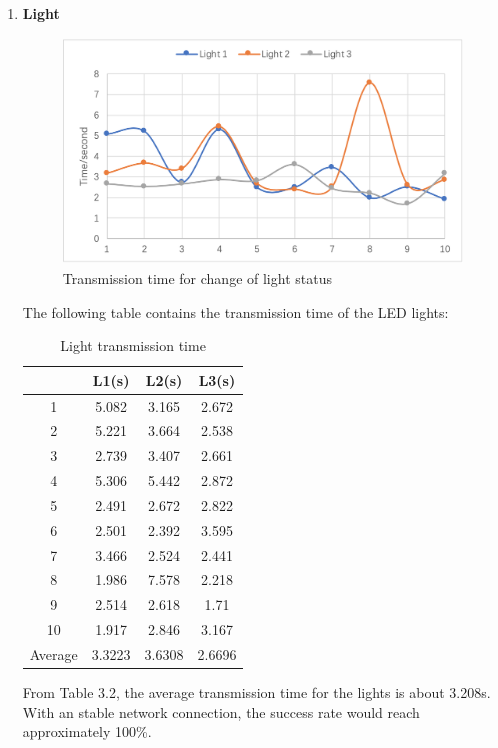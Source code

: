 \documentclass[12pt,a4paper]{report}
\begin{document}
\begin{enumerate}
\vspace{10cm}
\item \textbf{Light}

\begin{figure}[H]
	\centering
	\includegraphics[height=6cm,width=12cm]{figures/light.PNG}
	\caption{Transmission time for change of light status}
\end{figure}

The following table contains the transmission time of the LED lights:
\begin{table}[H]
	\centering
	\begin{tabular}{|c|c|c|c|}
		\hline
		&L1(s)&L2(s)&L3(s)\\ \hline
		1&	5.082&	3.165&	2.672
\\ \hline
		2&	5.221&	3.664&	2.538
\\ \hline
		3&	2.739&	3.407&	2.661
\\ \hline
		4&	5.306&	5.442&	2.872
\\ \hline
		5&	2.491&	2.672&	2.822
\\ \hline
		6&	2.501&	2.392&	3.595
\\ \hline
		7&	3.466&	2.524&	2.441
\\ \hline
		8&	1.986&	7.578&	2.218
\\ \hline
		9&	2.514&	2.618&	1.71
\\ \hline
		10&	1.917&	2.846&	3.167
\\ \hline
		Average&	3.3223&	3.6308&	2.6696
\\ \hline
	\end{tabular}
	\label{Light transmission time}
	\caption{Light transmission time}
\end{table}

From Table 3.2, the average transmission time for the lights is about 3.208s. With an stable network connection, the success rate would reach approximately 100\%.
\end{enumerate}
\end{document}
